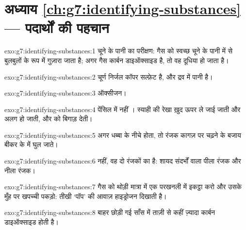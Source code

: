 \section*{अध्याय \ref{ch:g7:identifying-substances} --- पदार्थों की पहचान}

\begin{solution}{exo:g7:identifying-substances:1}
चूने के पानी का परीक्षण: गैस को स्वच्छ चूने के पानी में से बुलबुलों के रूप
में गुज़ारा जाता है; अगर गैस कार्बन डाइऑक्साइड है, तो वह दूधिया हो जाता है।
\end{solution}

\begin{solution}{exo:g7:identifying-substances:2}
चूर्ण निर्जल कॉपर सल्फ़ेट है, और द्रव में पानी है।
\end{solution}

\begin{solution}{exo:g7:identifying-substances:3}
ऑक्सीजन।
\end{solution}

\begin{solution}{exo:g7:identifying-substances:4}
पेंसिल  में नहीं । स्याही की रेखा ख़ुद ऊपर ले जाई जाती और अलग
हो जाती, और  को बिगाड़ देती।
\end{solution}

\begin{solution}{exo:g7:identifying-substances:5}
अगर धब्बा  के नीचे होता, तो रंजक कागज़ पर चढ़ने के बजाय बीकर के
 में घुल जाते।
\end{solution}

\begin{solution}{exo:g7:identifying-substances:6}
नहीं, वह दो रंजकों का  है: शायद संदर्भों वाला पीला रंजक और नीला
रंजक।
\end{solution}

\begin{solution}{exo:g7:identifying-substances:7}
गैस को थोड़ी मात्रा में एक परखनली में इकट्ठा करो और उसके मुँह पर 
खपच्ची पकड़ो: तीखी `पॉप' की आवाज़ हाइड्रोजन दिखाती है।
\end{solution}

\begin{solution}{exo:g7:identifying-substances:8}
बाहर छोड़ी गई साँस में ताज़ी  से कहीं ज़्यादा कार्बन डाइऑक्साइड होती है।
\end{solution}

